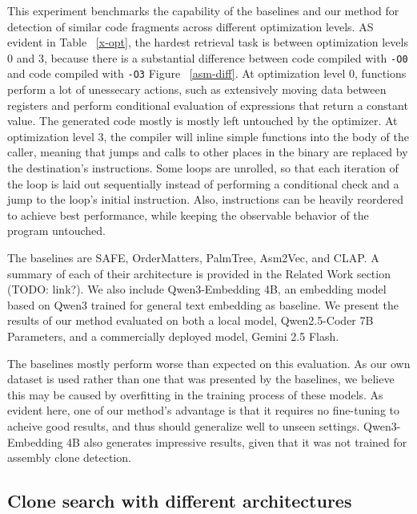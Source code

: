 \documentclass[conference,compsoc]{IEEEtran}
\begin{document}
This experiment benchmarks the capability of the baselines and our method for detection of similar code fragments across
different optimization levels. AS evident in Table ~\ref{x-opt}, the hardest retrieval task is between optimization levels 0 and 3,
because there is a substantial difference between code compiled with \texttt{-O0} and code compiled with \texttt{-O3}
Figure ~\ref{asm-diff}. At optimization level 0, functions perform a lot of unessecary actions, such as extensively moving
data between registers and perform conditional evaluation of expressions that return a constant value. The generated code
mostly is mostly left untouched by the optimizer. At optimization level 3, the compiler will inline simple functions into the
body of the caller, meaning that jumps and calls to other places in the binary are replaced by the destination's instructions.
Some loops are unrolled, so that each iteration of the loop is laid out sequentially instead of performing a conditional check
and a jump to the loop's initial instruction. Also, instructions can be heavily reordered to achieve best performance, while
keeping the observable behavior of the program untouched.

The baselines are SAFE, OrderMatters, PalmTree, Asm2Vec, and CLAP. A summary of each of their architecture is provided in the Related
Work section (TODO: link?). We also include Qwen3-Embedding 4B, an embedding model based on Qwen3 trained for general text embedding as baseline.
We present the results of our method evaluated on both a local model, Qwen2.5-Coder 7B Parameters, and a commercially deployed model,
Gemini 2.5 Flash.

The baselines mostly perform worse than expected on this evaluation. As our own dataset is used
rather than one that was presented by the baselines, we believe this may be caused by overfitting in the training process of these models.
As evident here, one of our method's advantage is that it requires no fine-tuning to acheive good results, and thus should generalize
well to unseen settings. Qwen3-Embedding 4B also generates impressive results, given that it was not trained for assembly clone detection.

\subsection{Clone search with different architectures}
\end{document}
